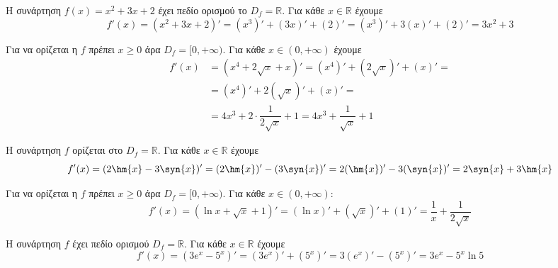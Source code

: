 \begin{alist}
\item Η συνάρτηση $ f(x)=x^2+3x+2 $ έχει πεδίο ορισμού το $ D_f=\mathbb{R} $. Για κάθε $ x\in\mathbb{R} $ έχουμε
\[ f'(x)=\left(x^2+3x+2\right)'=(x^3)'+(3x)'+(2)'=(x^3)'+3(x)'+(2)'=3x^2+3 \]
\item Για να ορίζεται η $ f $ πρέπει $ x\geq 0 $ άρα $ D_f=[0,+\infty) $. Για κάθε $ x\in(0,+\infty) $ έχουμε
\begin{align*}
f'(x)&=\left(x^4+2\sqrt{x}+x\right)'=(x^4)'+(2\sqrt{x})'+(x)'=\\&=(x^4)'+2(\sqrt{x})'+(x)'=\\&=4x^3+2\cdot\dfrac{1}{2\sqrt{x}}+1=4x^3+\dfrac{1}{\sqrt{x}}+1
\end{align*}
\item Η συνάρτηση $ f $ ορίζεται στο $ D_f=\mathbb{R} $. Για κάθε $ x\in\mathbb{R} $ έχουμε
\[ f'(x)=(2\hm{x}-3\syn{x})'=(2\hm{x})'-(3\syn{x})'=2(\hm{x})'-3(\syn{x})'=2\syn{x}+3\hm{x} \]
\item Για να ορίζεται η $ f $ πρέπει $ x\geq 0 $ άρα $ D_f=[0,+\infty) $. Για κάθε $ x\in(0,+\infty) $:
\[ f'(x)=\left(\ln{x}+\sqrt{x}+1\right)'=(\ln{x})'+(\sqrt{x})'+(1)'=\frac{1}{x}+\frac{1}{2\sqrt{x}} \]
\item Η συνάρτηση $ f $ έχει πεδίο ορισμού $ D_f=\mathbb{R} $. Για κάθε $ x\in\mathbb{R} $ έχουμε
\[ f'(x)=\left(3e^x-5^x\right)'=(3e^x)'+(5^x)'=3(e^x)'-(5^x)'=3e^x-5^x\ln{5} \]
\end{alist}
